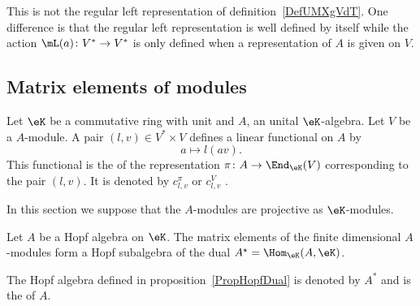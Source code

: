 \begin{remark}
	This is not the regular left representation of definition~\ref{DefUMXgVdT}. One difference is that the regular left representation is well defined by itself while the action \( \mL(a)\colon V^*\to V^*\) is only defined when a representation of \( A\) is given on \( V\).
\end{remark}

\subsection{Matrix elements of modules}

Let \( \eK\) be a commutative ring with unit and \( A\), an unital \( \eK\)-algebra. Let \( V\) be a \( A\)-module. A pair \( (l,v)\in V^*\times V\) defines a linear functional on \( A\) by
\begin{equation}
	a\mapsto l(av).
\end{equation}
This functional is the  of the representation \( \pi\colon A\to \End_{\eK}(V)\) corresponding to the pair \( (l,v)\). It is denoted by \( c^{\pi}_{l,v}\) or \( c^V_{l,v}\)  .

In this section we suppose that the \( A\)-modules are projective as \( \eK\)-modules.

\begin{proposition}     \label{PropHopfDual}
	Let \( A\) be a Hopf algebra on \( \eK\). The matrix elements of the finite dimensional \( A\)-modules form a Hopf subalgebra of the dual \( A^{\star}=\Hom_{\eK}(A,\eK)\).
\end{proposition}

The Hopf algebra defined in proposition~\ref{PropHopfDual} is denoted by \( A^*\) and is the  of \( A\).

